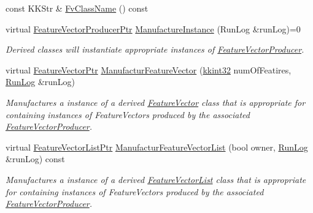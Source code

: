 \begin{DoxyCompactItemize}
\item 
const K\+K\+Str \& \hyperlink{class_k_k_m_l_l_1_1_factory_f_v_producer_a34344a8585523f7e7d4d920ca61c620b}{Fv\+Class\+Name} () const 
\item 
virtual \hyperlink{namespace_k_k_m_l_l_a5fcda00f9ffbd9fb40e02f013be900e3}{Feature\+Vector\+Producer\+Ptr} \hyperlink{class_k_k_m_l_l_1_1_factory_f_v_producer_ab69f27aed9bda4917326580ec824e749}{Manufacture\+Instance} (Run\+Log \&run\+Log)=0
\begin{DoxyCompactList}\small\item\em Derived classes will instantiate appropriate instances of \textquotesingle{}\hyperlink{class_k_k_m_l_l_1_1_feature_vector_producer}{Feature\+Vector\+Producer}\textquotesingle{}. \end{DoxyCompactList}\item 
virtual \hyperlink{namespace_k_k_m_l_l_a0c5df3d48f45926fbc4fee04f5e3bc04}{Feature\+Vector\+Ptr} \hyperlink{class_k_k_m_l_l_1_1_factory_f_v_producer_a5492ebd18425cbb7c4d217506691b69a}{Manufactur\+Feature\+Vector} (\hyperlink{namespace_k_k_b_a8fa4952cc84fda1de4bec1fbdd8d5b1b}{kkint32} num\+Of\+Featires, \hyperlink{class_k_k_b_1_1_run_log}{Run\+Log} \&run\+Log)
\begin{DoxyCompactList}\small\item\em Manufactures a instance of a derived \textquotesingle{}\hyperlink{class_k_k_m_l_l_1_1_feature_vector}{Feature\+Vector}\textquotesingle{} class that is appropriate for containing instances of Feature\+Vectors produced by the associated \hyperlink{class_k_k_m_l_l_1_1_feature_vector_producer}{Feature\+Vector\+Producer}. \end{DoxyCompactList}\item 
virtual \hyperlink{namespace_k_k_m_l_l_acf2ba92a3cf03e2b19674b24ff488ef6}{Feature\+Vector\+List\+Ptr} \hyperlink{class_k_k_m_l_l_1_1_factory_f_v_producer_a96126b7adb55f6751450ede393c93086}{Manufactur\+Feature\+Vector\+List} (bool owner, \hyperlink{class_k_k_b_1_1_run_log}{Run\+Log} \&run\+Log) const 
\begin{DoxyCompactList}\small\item\em Manufactures a instance of a derived \textquotesingle{}\hyperlink{class_k_k_m_l_l_1_1_feature_vector_list}{Feature\+Vector\+List}\textquotesingle{} class that is appropriate for containing instances of Feature\+Vectors produced by the associated \hyperlink{class_k_k_m_l_l_1_1_feature_vector_producer}{Feature\+Vector\+Producer}. \end{DoxyCompactList}\item 

\end{DoxyCompactItemize}
